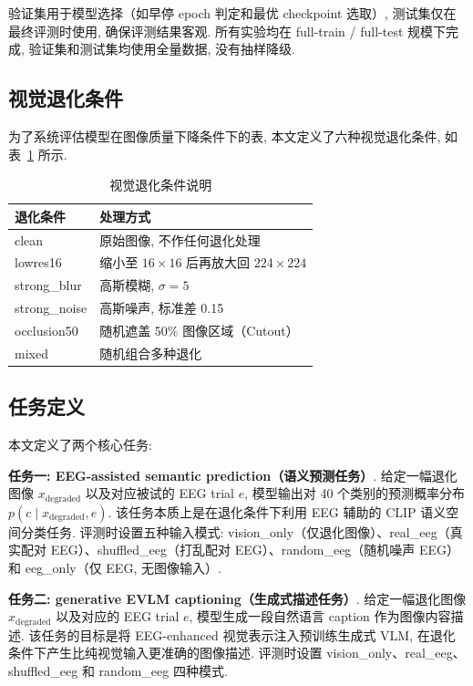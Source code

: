 验证集用于模型选择（如早停 epoch 判定和最优 checkpoint 选取）, 测试集仅在最终评测时使用, 确保评测结果客观. 所有实验均在 full-train / full-test 规模下完成, 验证集和测试集均使用全量数据, 没有抽样降级.

\subsection{视觉退化条件}

为了系统评估模型在图像质量下降条件下的表, 本文定义了六种视觉退化条件, 如表~\ref{tab:corruptions} 所示.

\begin{table}[H]
  \centering
  \caption{视觉退化条件说明}
  \label{tab:corruptions}
  \begin{tabular}{l l}
    \toprule
    退化条件 & 处理方式 \\
    \midrule
    clean & 原始图像, 不作任何退化处理 \\
    lowres16 & 缩小至 $16\times16$ 后再放大回 $224\times224$ \\
    strong\_blur & 高斯模糊, $\sigma=5$ \\
    strong\_noise & 高斯噪声, 标准差 0.15 \\
    occlusion50 & 随机遮盖 50\% 图像区域（Cutout）\\
    mixed & 随机组合多种退化 \\
    \bottomrule
  \end{tabular}
\end{table}

\subsection{任务定义}

本文定义了两个核心任务:

\textbf{任务一: EEG-assisted semantic prediction（语义预测任务）}. 给定一幅退化图像 $x_{\mathrm{degraded}}$ 以及对应被试的 EEG trial $e$, 模型输出对 40 个类别的预测概率分布 $p(c \mid x_{\mathrm{degraded}}, e)$. 该任务本质上是在退化条件下利用 EEG 辅助的 CLIP 语义空间分类任务. 评测时设置五种输入模式: vision\_only（仅退化图像）、real\_eeg（真实配对 EEG）、shuffled\_eeg（打乱配对 EEG）、random\_eeg（随机噪声 EEG）和 eeg\_only（仅 EEG, 无图像输入）.

\textbf{任务二: generative EVLM captioning（生成式描述任务）}. 给定一幅退化图像 $x_{\mathrm{degraded}}$ 以及对应的 EEG trial $e$, 模型生成一段自然语言 caption 作为图像内容描述. 该任务的目标是将 EEG-enhanced 视觉表示注入预训练生成式 VLM, 在退化条件下产生比纯视觉输入更准确的图像描述. 评测时设置 vision\_only、real\_eeg、shuffled\_eeg 和 random\_eeg 四种模式.

